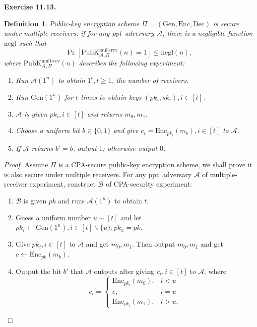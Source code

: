 \documentclass[a4paper]{article}
\newtheorem{definition}{Definition}
\newtheorem*{proof}{Proof}
\newenvironment{exercise}[1]{
	\par
	\noindent\textbf{Exercise #1.}\quad
}{
	\par
	\bigskip
}
\newcommand{\sbra}[1]{\left[ #1 \right]}
\newcommand{\bin}{\{0,1\}}
\newcommand{\Enc}{\mathrm{Enc}}
\newcommand{\Gen}{\mathrm{Gen}}
\newcommand{\Dec}{\mathrm{Dec}}
\newcommand{\PubK}{\mathrm{PubK}}
\newcommand{\negl}{\mathrm{negl}}
\newcommand{\ppt}{{\sc ppt}~}
\newcommand{\Acal}{\mathcal{A}}
\newcommand{\Bcal}{\mathcal{B}}
\begin{document}
\begin{exercise}{11.13}
\begin{definition}
    Public-key encryption scheme $\Pi=(\Gen,\Enc,\Dec)$ is \emph{secure under multiple receivers}, if for any
    \ppt adversary $\Acal$, there is a negligible function $\negl$ such that 
    $$
    \Pr\sbra{\PubK^{\mathrm{mult}\text{-}\mathrm{rcv}}_{\Acal,\Pi}(n)=1}\leq\negl(n),
    $$
    where $\PubK_{\Acal,\Pi}^{\mathrm{mult}\text{-}\mathrm{rcv}}(n)$ describes the following experiment:
    \begin{enumerate}
        \item Run $\Acal(1^n)$ to obtain $1^t,t\geq 1$, the number of receivers.
        \item Run $\Gen(1^n)$ for $t$ times to obtain keys $(pk_i,sk_i),i\in[t]$.
        \item $\Acal$ is given $pk_i,i\in[t]$ and returns $m_0,m_1$.
        \item Choose a uniform bit $b\in\bin$ and give $c_i=\Enc_{pk_i}(m_b),i\in[t]$ to $\Acal$.
        \item If $\Acal$ returns $b'=b$, output $1$; otherwise output $0$.
    \end{enumerate}
\end{definition}
\begin{proof}
    Assume $\Pi$ is a CPA-secure public-key encryption scheme, we shall prove it is also secure under multiple receivers.
    For any \ppt adversary $\Acal$ of multiple-receiver experiment, construct $\Bcal$ of CPA-security experiment:
    \begin{enumerate}
        \item $\Bcal$ is given $pk$ and runs $\Acal(1^n)$ to obtain $t$.
        \item Guess a uniform number $u\sim[t]$ and let $pk_i\gets\Gen(1^n),i\in[t]\backslash\{u\},pk_u=pk$.
        \item Give $pk_i,i\in[t]$ to $\Acal$ and get $m_0,m_1$. Then output $m_0,m_1$ and get $c\gets\Enc_{pk}(m_b)$.
        \item Output the bit $b'$ that $\Acal$ outputs after giving $c_i,i\in[t]$ to $\Acal$, where
            $$
            c_i=\begin{cases}
                \Enc_{pk_i}(m_0), & i<u\\
                c, & i=u\\
                \Enc_{pk_i}(m_1), & i>u.
            \end{cases}
            $$
    \end{enumerate}

\end{proof}
\end{exercise}
\end{document}
